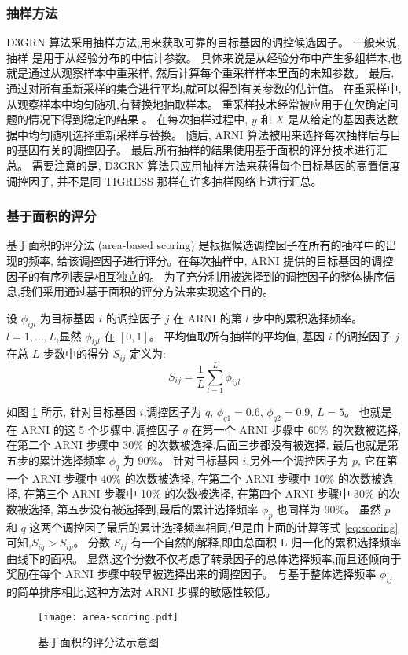 \subsubsection{抽样方法}

D3GRN 算法采用抽样方法,用来获取可靠的目标基因的调控候选因子。
一般来说,抽样  是用于从经验分布的中估计参数。
具体来说是从经验分布中产生多组样本,也就是通过从观察样本中重采样, 
然后计算每个重采样样本里面的未知参数。
最后,通过对所有重新采样的集合进行平均,就可以得到有关参数的估计值。
在重采样中, 从观察样本中均匀随机,有替换地抽取样本。
重采样技术经常被应用于在欠确定问题的情况下得到稳定的结果 。
在每次抽样过程中, $y$ 和 $X$ 是从给定的基因表达数据中均匀随机选择重新采样与替换。
随后, ARNI 算法被用来选择每次抽样后与目的基因有关的调控因子。
最后,所有抽样的结果使用基于面积的评分技术进行汇总。
需要注意的是, D3GRN 算法只应用抽样方法来获得每个目标基因的高置信度调控因子,
并不是同 TIGRESS  那样在许多抽样网络上进行汇总。

\subsubsection{基于面积的评分}
基于面积的评分法 (area-based scoring) 是根据候选调控因子在所有的抽样中的出现的频率,
给该调控因子进行评分。在每次抽样中, ARNI 提供的目标基因的调控因子的有序列表是相互独立的。
为了充分利用被选择到的调控因子的整体排序信息,我们采用通过基于面积的评分方法来实现这个目的。

设 $\phi_{ijl}$ 为目标基因 $i$ 的调控因子 $j$ 在 ARNI 的第 $l$ 步中的累积选择频率。
$l={1,\ldots,L}$,显然 $\phi_{ijl}$ 在 $[0,1]$。
平均值取所有抽样的平均值, 
基因 $i$ 的调控因子 $j$ 在总 $L$ 步数中的得分 $S_{ij}$ 定义为:
\begin{equation}
\label{eq:scoring}
S_{ij} = \frac{1}{L} \sum_{l=1}^{L} \phi_{ijl}
\end{equation}

如图 \ref{area-scoring} 所示, 
针对目标基因 $i$,调控因子为 $q$,  $\phi_{q1}=0.6$, $\phi_{q2}=0.9$, $L=5$。
也就是在 ARNI 的这 5 个步骤中,调控因子 $q$ 在第一个 ARNI 步骤中 60\% 的次数被选择,
在第二个 ARNI 步骤中 30\% 的次数被选择,后面三步都没有被选择,
最后也就是第五步的累计选择频率 $\phi_{q}$ 为 90\%。
针对目标基因 $i$,另外一个调控因子为 $p$,
它在第一个 ARNI 步骤中 40\% 的次数被选择,
在第二个 ARNI 步骤中 10\% 的次数被选择,
在第三个 ARNI 步骤中 10\% 的次数被选择,
在第四个 ARNI 步骤中 30\% 的次数被选择,
第五步没有被选择到,最后的累计选择频率 $\phi_{p}$ 也同样为 90\%。
虽然 $p$ 和 $q$ 这两个调控因子最后的累计选择频率相同,但是由上面的计算等式 \ref{eq:scoring} 可知,$S_{iq} > S_{ip}$。
分数 $S_{ij}$ 有一个自然的解释,即由总面积 L 归一化的累积选择频率曲线下的面积。
显然,这个分数不仅考虑了转录因子的总体选择频率,而且还倾向于奖励在每个 ARNI 步骤中较早被选择出来的调控因子。
与基于整体选择频率 $\phi_{ij}$ 的简单排序相比,这种方法对 ARNI 步骤的敏感性较低。
\begin{figure}[!htbp]
  \centering
  \texttt{[image: area-scoring.pdf]}
  \caption{基于面积的评分法示意图}
  \label{area-scoring}
\end{figure}


